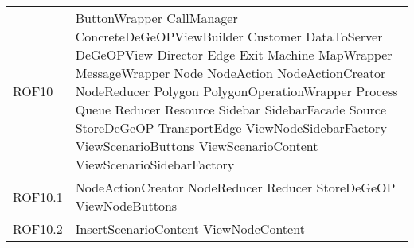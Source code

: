 \begin{longtable}{p{2.5cm}!{\VRule[1pt]}p{5cm}}
		ROF10 & ButtonWrapper \newline CallManager \newline ConcreteDeGeOPViewBuilder \newline Customer \newline DataToServer \newline DeGeOPView \newline Director \newline Edge \newline Exit \newline Machine \newline MapWrapper \newline MessageWrapper \newline Node \newline NodeAction \newline NodeActionCreator \newline NodeReducer \newline Polygon \newline PolygonOperationWrapper \newline Process \newline Queue \newline Reducer \newline Resource \newline Sidebar \newline SidebarFacade \newline Source \newline StoreDeGeOP \newline TransportEdge \newline ViewNodeSidebarFactory \newline ViewScenarioButtons \newline ViewScenarioContent \newline ViewScenarioSidebarFactory\\
		ROF10.1 & NodeActionCreator \newline NodeReducer \newline Reducer \newline StoreDeGeOP \newline ViewNodeButtons\\
		ROF10.2 & InsertScenarioContent \newline ViewNodeContent\\

\end{longtable}
